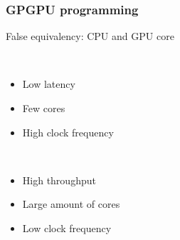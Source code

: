 \documentclass[lualatex, 9pt]{beamer}
\begin{document}
\begin{frame}
	\frametitle{GPGPU programming}
	False equivalency: CPU and GPU core
	\vfill
	\begin{center}
	\begin{minipage}{0.4\textwidth}
		\centering
		 \\[0.5cm]
		\begin{itemize}
		\item<2-> Low latency \\
		\item<3-> Few cores\\
		\item<4-> High clock frequency
		\end{itemize}
	\end{minipage}\begin{minipage}{0.4\textwidth}
	\centering
	 \\[0.5cm]
	\begin{itemize}
	\item<2-> High throughput \\
	\item<3-> Large amount of cores\\
	\item<4-> Low clock frequency
	\end{itemize}
\end{minipage}
\end{center}

\end{frame}
\end{document}

